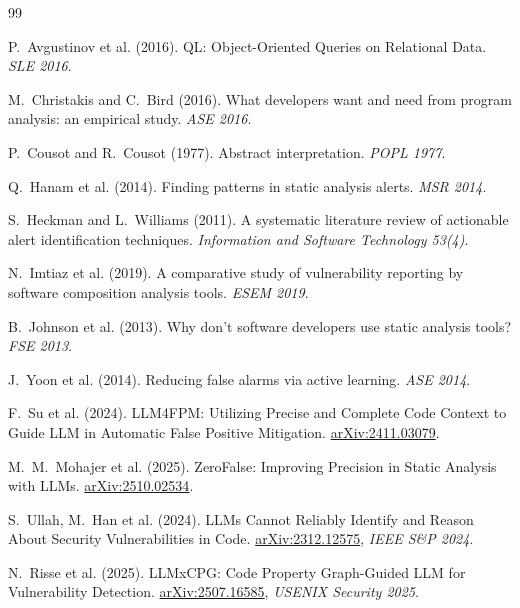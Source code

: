 \documentclass[11pt,a4paper]{article}
\begin{document}
\begin{thebibliography}{99}

P.~Avgustinov et al. (2016).
\newblock QL: Object-Oriented Queries on Relational Data.
\newblock \emph{SLE 2016}.

M.~Christakis and C.~Bird (2016).
\newblock What developers want and need from program analysis: an
  empirical study.
\newblock \emph{ASE 2016}.

P.~Cousot and R.~Cousot (1977).
\newblock Abstract interpretation.
\newblock \emph{POPL 1977}.

Q.~Hanam et al. (2014).
\newblock Finding patterns in static analysis alerts.
\newblock \emph{MSR 2014}.

S.~Heckman and L.~Williams (2011).
\newblock A systematic literature review of actionable alert
  identification techniques.
\newblock \emph{Information and Software Technology 53(4)}.

N.~Imtiaz et al. (2019).
\newblock A comparative study of vulnerability reporting by software
  composition analysis tools.
\newblock \emph{ESEM 2019}.

B.~Johnson et al. (2013).
\newblock Why don't software developers use static analysis tools?
\newblock \emph{FSE 2013}.

J.~Yoon et al. (2014).
\newblock Reducing false alarms via active learning.
\newblock \emph{ASE 2014}.

F.~Su et al. (2024).
\newblock LLM4FPM: Utilizing Precise and Complete Code Context to
  Guide LLM in Automatic False Positive Mitigation.
\newblock \href{https://arxiv.org/abs/2411.03079}{arXiv:2411.03079}.

M.~M.~Mohajer et al. (2025).
\newblock ZeroFalse: Improving Precision in Static Analysis with LLMs.
\newblock \href{https://arxiv.org/abs/2510.02534}{arXiv:2510.02534}.

S.~Ullah, M.~Han et al. (2024).
\newblock LLMs Cannot Reliably Identify and Reason About Security
  Vulnerabilities in Code.
\newblock \href{https://arxiv.org/abs/2312.12575}{arXiv:2312.12575},
  \emph{IEEE S\&P 2024}.

N.~Risse et al. (2025).
\newblock LLMxCPG: Code Property Graph-Guided LLM for Vulnerability
  Detection.
\newblock \href{https://arxiv.org/abs/2507.16585}{arXiv:2507.16585},
  \emph{USENIX Security 2025}.


\end{thebibliography}
\end{document}
